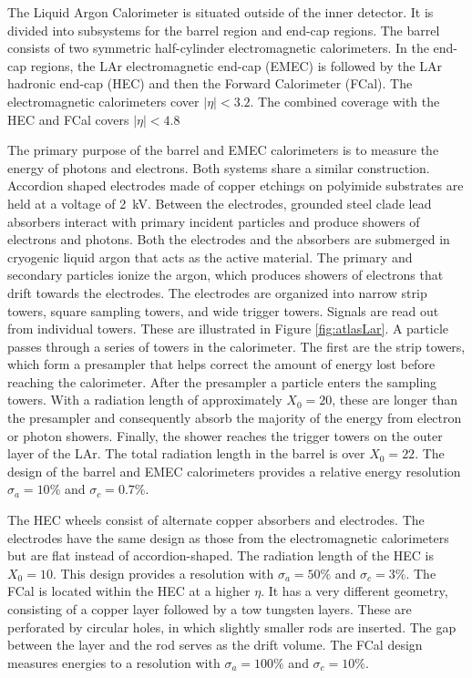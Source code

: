 The Liquid Argon Calorimeter is situated outside of the inner detector.
It is divided into subsystems for the barrel region and end-cap regions.
The barrel consists of two symmetric half-cylinder electromagnetic calorimeters.
In the end-cap regions, the LAr electromagnetic end-cap (EMEC) is followed by the LAr hadronic end-cap (HEC) and then the Forward Calorimeter (FCal).
The electromagnetic calorimeters cover $|\eta|<3.2$.
The combined coverage with the HEC and FCal covers $|\eta|<4.8$

The primary purpose of the barrel and EMEC calorimeters is to measure the energy of photons and electrons.
Both systems share a similar construction.
Accordion shaped electrodes made of copper etchings on polyimide substrates are held at a voltage of 2~kV.
Between the electrodes, grounded steel clade lead absorbers interact with primary incident particles and produce showers of electrons and photons.
Both the electrodes and the absorbers are submerged in cryogenic liquid argon that acts as the active material.
The primary and secondary particles ionize the argon, which produces showers of electrons that drift towards the electrodes.
The electrodes are organized into narrow strip towers, square sampling towers, and wide trigger towers.
Signals are read out from individual towers.
These are illustrated in Figure \ref{fig:atlasLar}.
A particle passes through a series of towers in the calorimeter.
The first are the strip towers, which form a presampler that helps correct the amount of energy lost before reaching the calorimeter.
After the presampler a particle enters the sampling towers.
With a radiation length of approximately $X_0=20$, these are longer than the presampler and consequently absorb the majority of the energy from electron or photon showers.
Finally, the shower reaches the trigger towers on the outer layer of the LAr.
The total radiation length in the barrel is over $X_0=22$.
The design of the barrel and EMEC calorimeters provides a relative energy resolution $\sigma_a=10\%$ and $\sigma_c=0.7\%$.
\cite{lar}

The HEC wheels consist of alternate copper absorbers and electrodes.
The electrodes have the same design as those from the electromagnetic calorimeters but are flat instead of accordion-shaped.
The radiation length of the HEC is $X_0=10$.
This design provides a resolution with $\sigma_a=50\%$ and $\sigma_c=3\%$.
The FCal is located within the HEC at a higher $\eta$.
It has a very different geometry, consisting of a copper layer followed by a tow tungsten layers.
These are perforated by circular holes, in which slightly smaller rods are inserted.
The gap between the layer and the rod serves as the drift volume.
The FCal design measures energies to a resolution with $\sigma_a=100\%$ and $\sigma_c=10\%$.
\cite{lar}

